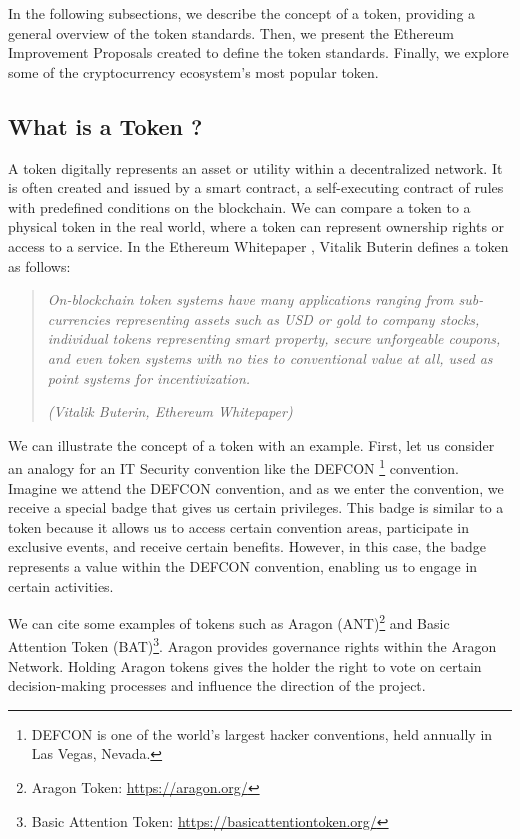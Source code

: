 In the following subsections, we describe the concept of a token, providing a general overview of the token standards. Then, we present
the Ethereum Improvement Proposals created to define the token standards. Finally, we explore some of the cryptocurrency ecosystem's most popular
token.



\subsection{What is a Token ?}

A token digitally represents an asset or utility within a decentralized network. It is often created and issued by
a smart contract, a self-executing contract of rules with predefined conditions on the blockchain. We can compare a token
to a physical token in the real world, where a token can represent ownership rights or access to a service. In the Ethereum Whitepaper
\cite{ethereum_white_paper}, Vitalik Buterin defines a token as follows:

\begin{quote}
   \textit{On-blockchain token systems have many applications ranging from sub-currencies representing assets such as USD or gold to
       company stocks, individual tokens representing smart property, secure unforgeable coupons, and even token systems with no ties to
       conventional value at all, used as point systems for incentivization.}


   \textit{(Vitalik Buterin, Ethereum Whitepaper)}
\end{quote}


We can illustrate the concept of a token with an example. First, let us consider an analogy for an IT Security convention like the DEFCON
\footnote{DEFCON is one of the world's largest hacker conventions, held annually in Las Vegas, Nevada.} convention. Imagine we attend
the DEFCON convention, and as we enter the convention, we receive a special badge that gives us certain privileges. This badge
is similar to a token because it allows us to access certain convention areas, participate in exclusive events, and receive certain benefits. However, in this case, the badge represents a value within the DEFCON convention, enabling us to engage
in certain activities.

We can cite some examples of tokens such as Aragon (ANT)\footnote{Aragon Token: \url{https://aragon.org/}} and Basic Attention Token (BAT)\footnote{Basic Attention Token: \url{https://basicattentiontoken.org/}}.
Aragon provides governance rights within the Aragon Network. Holding Aragon tokens gives the holder the right to vote on certain
decision-making processes and influence the direction of the project.

